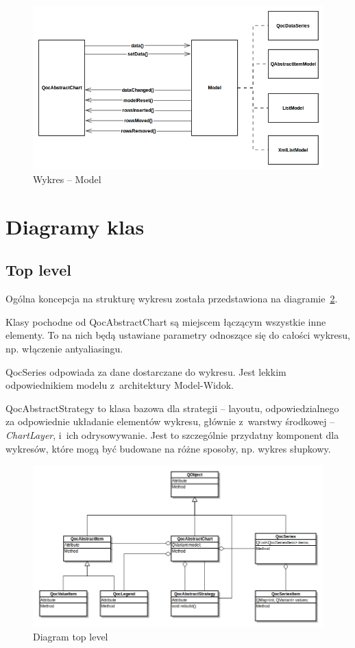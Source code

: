 \begin{figure}
\centering
\caption{Wykres -- Model}\label{rys:wykres:model}
\includegraphics[scale=0.8]{img/wykres-model.png}
\end{figure}

\section{Diagramy klas}

\subsection{Top level}
Ogólna koncepcja na strukturę wykresu została przedstawiona na diagramie~\ref{rys:klasy:top_level}.

Klasy pochodne od QocAbstractChart są miejscem łączącym wszystkie inne elementy. To na nich będą ustawiane parametry odnoszące się do całości wykresu, np. włączenie antyaliasingu.

QocSeries odpowiada za dane dostarczane do wykresu. Jest lekkim odpowiednikiem modelu z~architektury Model-Widok.

QocAbstractStrategy to klasa bazowa dla strategii -- layoutu, odpowiedzialnego za odpowiednie układanie elementów wykresu, głównie z~warstwy środkowej -- \textit{ChartLayer}, i~ich odrysowywanie. Jest to szczególnie przydatny komponent dla wykresów, które mogą być budowane na różne sposoby, np. wykres słupkowy.


\begin{figure}
\centering
\caption{Diagram top level}\label{rys:klasy:top_level}
\includegraphics[scale=0.5]{img/klasy-top_level.png}
\end{figure}


